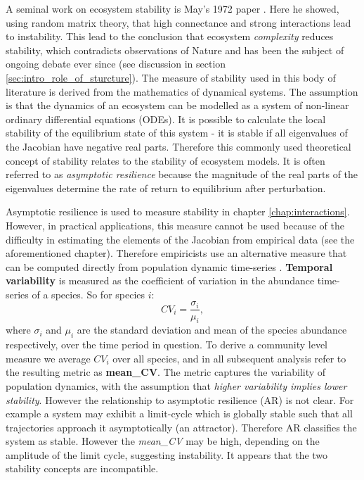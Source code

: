 A seminal work on ecosystem stability is May's 1972 paper \cite{may1972will}. Here he showed, using random matrix theory, that high connectance and strong interactions lead to instability. This lead to the conclusion that ecosystem \emph{complexity} reduces stability, which contradicts observations of Nature and has been the subject of ongoing debate ever since (see discussion in section \ref{sec:intro_role_of_sturcture}). The measure of stability used in this body of literature is derived from the mathematics of dynamical systems. The assumption is that the dynamics of an ecosystem can be modelled as a system of non-linear ordinary differential equations (ODEs). It is possible to calculate the local stability of the equilibrium state of this system - it is stable if all eigenvalues of the Jacobian have negative real parts. Therefore this commonly used theoretical concept of stability relates to the stability of ecosystem models. It is often referred to as \emph{asymptotic resilience} \cite{arnoldi2015} because the magnitude of the real parts of the eigenvalues determine the rate of return to equilibrium after perturbation. 

Asymptotic resilience is used to measure stability in chapter \ref{chap:interactions}. However, in practical applications, this measure cannot be used because of the difficulty in estimating the elements of the Jacobian from empirical data (see the aforementioned chapter). Therefore empiricists use an alternative measure that can be computed directly from population dynamic time-series \cite{campbell2011experimental, donohue2013dimensionality}. \textbf{Temporal variability} is measured as the coefficient of variation in the abundance time-series of a species. So for species $i$: 
\begin{equation}
CV_i = \frac{\sigma_i}{\mu_i},
\label{eq:cov}
\end{equation}
%
where $\sigma_i$ and $\mu_i$ are the standard deviation and mean of the species abundance respectively, over the time period in question. To derive a community level measure we average $CV_i$ over all species, and in all subsequent analysis refer to the resulting metric as \textbf{mean\_CV}. The metric captures the variability of population dynamics, with the assumption that \emph{higher variability implies lower stability}. However the relationship to asymptotic resilience (AR) is not clear. For example a system may exhibit a limit-cycle which is globally stable such that all trajectories approach it asymptotically (an attractor). Therefore AR classifies the system as stable. However the \emph{mean\_CV} may be high, depending on the amplitude of the limit cycle, suggesting instability. It appears that the two stability concepts are incompatible.


